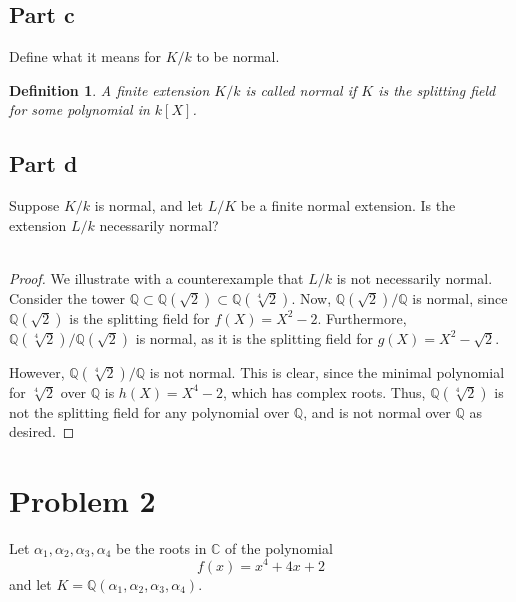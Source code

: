 \documentclass[12pt,reqno]{amsart}
\newcommand{\C}{\mathbb{C}}
\newcommand{\Q}{\mathbb{Q}}
\newtheorem*{defn}{Definition}
\begin{document}
\subsection*{Part c}
Define what it means for $K/k$ to be normal.

\begin{defn}
    A finite extension $K/k$ is called normal if $K$ is the splitting field for
    some polynomial in $k[X]$.
\end{defn}

\subsection*{Part d}
Suppose $K/k$ is normal, and let $L/K$ be a finite normal extension. Is the
extension $L/k$ necessarily normal?
\\
\\
\begin{proof}
    We illustrate with a counterexample that $L/k$ is not necessarily normal.
    Consider the tower $\Q\subset \Q(\sqrt{2})\subset \Q(\sqrt[4]{2})$. Now,
    $\Q(\sqrt{2})/\Q$ is normal, since $\Q(\sqrt{2})$ is the splitting field for
    $f(X) = X^2-2$. Furthermore, $\Q(\sqrt[4]{2})/\Q(\sqrt{2})$ is normal, as it
    is the splitting field for $g(X) = X^2 - \sqrt{2}$.

    However, $\Q(\sqrt[4]{2})/\Q$ is not normal. This is clear, since the
    minimal polynomial for $\sqrt[4]{2}$ over $\Q$ is $h(X) = X^4-2$, which has
    complex roots. Thus, $\Q(\sqrt[4]{2})$ is not the splitting field for any
    polynomial over $\Q$, and is not normal over $\Q$ as desired.
\end{proof}

\newpage

\section*{Problem 2}
Let $\alpha_1,\alpha_2,\alpha_3,\alpha_4$ be the roots in $\C$ of the
polynomial
\[
    f(x) = x^4 +4x+2
\]
and let $K = \Q(\alpha_1,\alpha_2,\alpha_3,\alpha_4)$.
\end{document}
